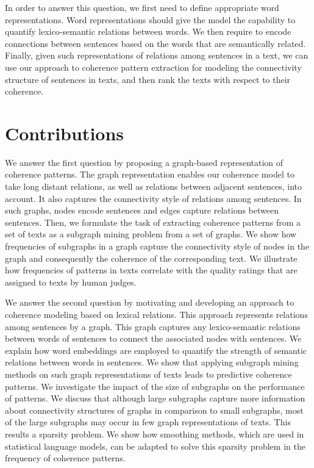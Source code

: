 In order to answer this question, we first need to define appropriate word representations.  
Word representations should give the model the capability to quantify lexico-semantic relations between words. 
We then require to encode connections between sentences based on the words that are semantically related. 
Finally, given such representations of relations among sentences in a text, we can use our approach to coherence pattern extraction for modeling the connectivity structure of sentences in texts, and then rank the texts with respect to their coherence. 

\section{Contributions}
\label{sec:intro-contributions}

We answer the first question by proposing a graph-based representation of coherence patterns. 
The graph representation enables our coherence model to take long distant relations, as well as relations between adjacent sentences,  into account. 
It also captures the connectivity style of relations among sentences. 
In such graphs, nodes encode sentences and edges capture relations between sentences. 
Then, we formulate the task of extracting coherence patterns from a set of texts as a subgraph mining problem from a set of graphs. 
We show how frequencies of subgraphs in a graph capture the connectivity style of nodes in the graph and consequently the coherence of the corresponding text. 
We illustrate how frequencies of patterns in texts correlate with the quality ratings that are assigned to texts by human judges. 

We answer the second question by motivating and developing an approach to coherence modeling based on lexical relations. 
This approach represents relations among sentences by a graph. 
This graph captures any lexico-semantic relations between words of sentences to connect the associated nodes with sentences. 
We explain how word embeddings are employed to quantify the strength of semantic relations between words in sentences. 
We show that applying subgraph mining methods on such graph representations of texts leads to  predictive coherence patterns. 
We investigate the impact of the size of subgraphs on the performance of patterns. 
We discuss that although large subgraphs capture more information about connectivity structures of graphs in comparison to small subgraphs, most of the large subgraphs may occur in few graph representations of texts.  
This results a sparsity problem. 
We show how smoothing methods, which are used in statistical language models, can be adapted to solve this sparsity problem in the frequency of coherence patterns. 

